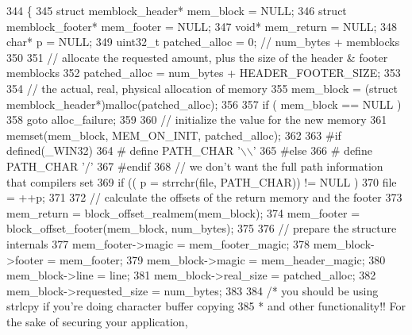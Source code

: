 \begin{DoxyCode}
344 \{
345         \textcolor{keyword}{struct }memblock_header* mem\_block = NULL;
346         \textcolor{keyword}{struct }memblock_footer* mem\_footer = NULL;
347         \textcolor{keywordtype}{void}*                   mem\_return = NULL;
348         \textcolor{keywordtype}{char}*                   p = NULL;
349         uint32\_t                patched\_alloc = 0;      \textcolor{comment}{// num\_bytes + memblocks}
350 
351         \textcolor{comment}{// allocate the requested amount, plus the size of the header & footer memblocks}
352         patched\_alloc = num\_bytes + HEADER_FOOTER_SIZE;
353 
354         \textcolor{comment}{// the actual, real, physical allocation of memory}
355         mem\_block = (\textcolor{keyword}{struct }memblock_header*)malloc(patched\_alloc);
356 
357         \textcolor{keywordflow}{if} ( mem\_block == NULL )
358                 \textcolor{keywordflow}{goto} alloc\_failure;
359 
360         \textcolor{comment}{// initialize the value for the new memory}
361         memset(mem\_block, MEM_ON_INIT, patched\_alloc);
362 
363 \textcolor{preprocessor}{#if defined(\_WIN32)
}
364 \textcolor{preprocessor}{}\textcolor{preprocessor}{#       define PATH\_CHAR        '\(\backslash\)\(\backslash\)'
}
365 \textcolor{preprocessor}{}\textcolor{preprocessor}{#else
}
366 \textcolor{preprocessor}{}\textcolor{preprocessor}{#       define PATH\_CHAR        '/'
}
367 \textcolor{preprocessor}{}\textcolor{preprocessor}{#endif
}
368 \textcolor{preprocessor}{}        \textcolor{comment}{// we don't want the full path information that compilers set}
369         \textcolor{keywordflow}{if} (( p = strrchr(file, PATH_CHAR)) != NULL )
370                 file = ++p;
371 
372         \textcolor{comment}{// calculate the offsets of the return memory and the footer}
373         mem\_return = block_offset_realmem(mem\_block);
374         mem\_footer = block_offset_footer(mem\_block, num\_bytes);
375 
376         \textcolor{comment}{// prepare the structure internals}
377         mem\_footer->magic       = mem_footer_magic;
378         mem\_block->footer       = mem\_footer;
379         mem\_block->magic        = mem_header_magic;
380         mem\_block->line         = line;
381         mem\_block->real_size            = patched\_alloc;
382         mem\_block->requested_size       = num\_bytes;
383 
384         \textcolor{comment}{/* you should be using strlcpy if you're doing character buffer copying
}
385 \textcolor{comment}{         * and other functionality!! For the sake of securing your application,
}
\end{DoxyCode}
